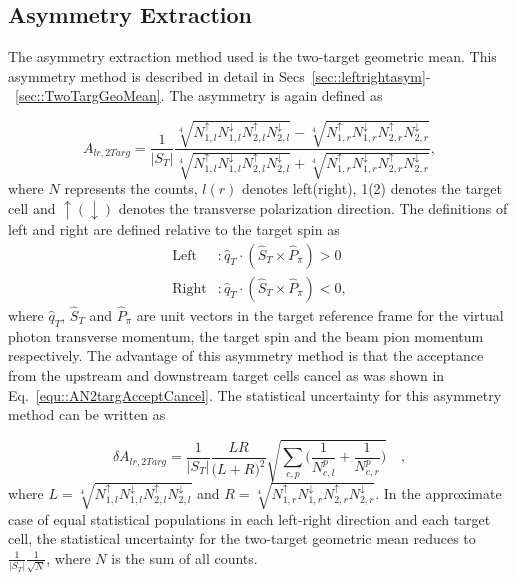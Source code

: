 \subsection{Asymmetry Extraction}
The asymmetry extraction method used is the two-target geometric mean.  This
asymmetry method is described in detail in
Secs~\ref{sec::leftrightasym}-~\ref{sec::TwoTargGeoMean}.  The asymmetry is
again defined as

\begin{equation}
  \label{equ::AN4TargGeomeanJPsi}
  A_{lr,2Targ} =
  \frac{1}{|S_T|}
  \frac{ \sqrt[4]{ N_{1,l}^\uparrow N_{1, l}^\downarrow
      N_{2,l}^\uparrow N_{2, l}^\downarrow }
    - \sqrt[4]{ N_{1,r}^\uparrow N_{1,r}^\downarrow
      N_{2,r}^\uparrow N_{2,r}^\downarrow }
  }{
    \sqrt[4]{ N_{1,l}^\uparrow N_{1, l}^\downarrow
      N_{2,l}^\uparrow N_{2, l}^\downarrow }
    + \sqrt[4]{ N_{1,r}^\uparrow N_{1,r}^\downarrow
      N_{2,r}^\uparrow N_{2,r}^\downarrow } },
\end{equation}
\noindent
where $N$ represents the counts, $l(r)$ denotes left(right), 1(2) denotes the
target cell and $\uparrow(\downarrow)$ denotes the transverse polarization
direction.  The definitions of left and right are defined relative to the target
spin as
\begin{equation}
  \begin{aligned}
    \text{Left} &: \hat{q}_T \cdot (\hat{S}_T \times \hat{P}_{\pi}) > 0 \\
    \text{Right} &: \hat{q}_T \cdot (\hat{S}_T \times \hat{P}_{\pi}) < 0, 
  \end{aligned}
\end{equation}
\noindent
where $\hat{q}_T$, $\hat{S}_T$ and $\hat{P}_{\pi}$ are unit vectors in the
target reference frame for the virtual photon transverse momentum, the target
spin and the beam pion momentum respectively.  The advantage of this asymmetry
method is that the acceptance from the upstream and downstream target cells
cancel as was shown in Eq.~\ref{equ::AN2targAcceptCancel}.  The statistical
uncertainty for this asymmetry method can be written as

\begin{equation}
  \delta A_{lr,2Targ} = \frac{1}{|S_T|}
  \frac{LR}{\Big( L+R \Big)^2}
  \sqrt{
    \sum_{c,p}
    \Big(
    \frac{1}{N_{c,l}^{p}}
    + \frac{1}{N_{c,r}^p}
    \Big)
  } \quad,
\end{equation}
where $L =\sqrt[4]{N_{1,l}^\uparrow N_{1,l}^\downarrow N_{2,l}^\uparrow
  N_{2,l}^\downarrow}$ and $R =\sqrt[4]{N_{1,r}^\uparrow N_{1,r}^\downarrow
  N_{2,r}^\uparrow N_{2,r}^\downarrow}$.  In the approximate case of equal
statistical populations in each left-right direction and each target cell, the
statistical uncertainty for the two-target geometric mean reduces to
$\frac{1}{|S_T|}\frac{1}{\sqrt{N}}$, where $N$ is the sum of all counts.

